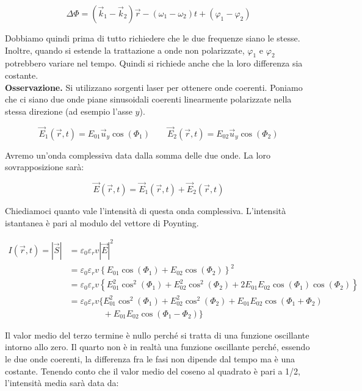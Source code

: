 \[
	\Delta \Phi = (\vec{k}_1 - \vec{k}_2)\vec{r} -(\omega_1 - \omega_2) t + (\varphi_1 - \varphi _2  )
\]

Dobbiamo quindi prima di tutto richiedere che le due frequenze siano le stesse. Inoltre, quando si estende la trattazione a onde non polarizzate, $\varphi_1$ e $\varphi_2$ potrebbero variare nel tempo. Quindi si richiede anche che la loro differenza sia costante.\\
\textbf{Osservazione.} Si utilizzano sorgenti laser per ottenere onde coerenti.
Poniamo che ci siano due onde piane sinusoidali coerenti linearmente polarizzate nella stessa direzione (ad esempio l'asse $y$).

\[
	\vec{E}_1(\vec{r},t) = E_{01} \vec{u}_y \cos (\Phi_1) \qquad \vec{E}_2(\vec{r},t) = E_{02} \vec{u}_y \cos (\Phi_2)
\]

Avremo un'onda complessiva data dalla somma delle due onde. La loro sovrapposizione sarà:

\[
	\vec{E} (\vec{r},t) = \vec{E}_1(\vec{r},t) + \vec{E}_2(\vec{r},t)
\]

Chiediamoci quanto vale l'intensità di questa onda complessiva. L'intensità istantanea è pari al modulo del vettore di Poynting.

\begin{equation*}
	\begin{aligned}
		I(\vec{r},t) = |\vec{S}| &= \varepsilon_0 \varepsilon_r v |\vec{E}|^2 \\
		&=\varepsilon_0 \varepsilon_r v \left\{ E_{01}\cos (\Phi_1) + E_{02}\cos (\Phi_2 )  \right\}^2 \\
		&= \varepsilon_0 \varepsilon_r v \left\{ E_{01}^2 \cos^2 (\Phi_1 ) + E_{02}^2 \cos^2 (\Phi_2 ) + 2 E_{01}E_{02}\cos (\Phi_1 )\cos (\Phi_2 ) \right\} \\
		&= \varepsilon_0 \varepsilon_r v \{ E_{01}^2 \cos^2 (\Phi_1 ) + E_{02}^2 \cos^2 (\Phi_2 ) + E_{01}E_{02}\cos (\Phi_1 + \Phi_2) \\
		&\qquad\qquad + E_{01}E_{02}\cos (\Phi_1 - \Phi_2) \}
	\end{aligned}
\end{equation*}

Il valor medio del terzo termine è nullo perché si tratta di una funzione oscillante intorno allo zero. Il quarto non è in realtà una funzione oscillante perché, essendo le due onde coerenti, la differenza fra le fasi non dipende dal tempo ma è una costante.
Tenendo conto che il valor medio del coseno al quadrato è pari a 1/2, l'intensità media sarà data da:

